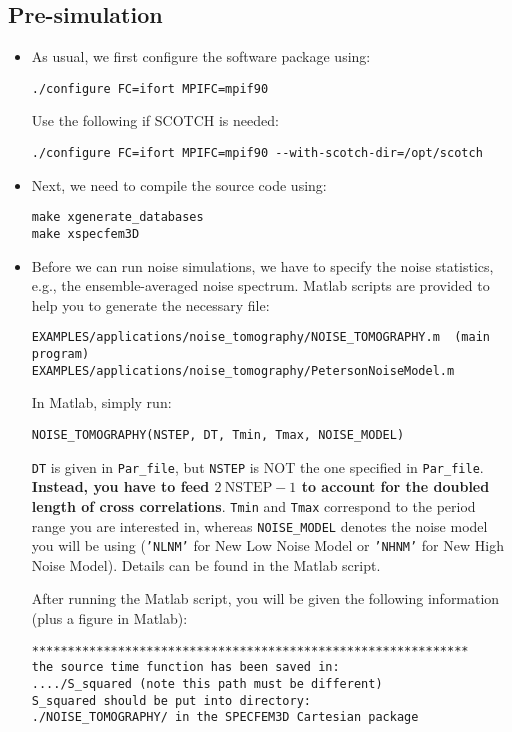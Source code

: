 \subsection{Pre-simulation}
\begin{itemize}
\item As usual, we first configure the software package using:
\begin{verbatim}
./configure FC=ifort MPIFC=mpif90
\end{verbatim}

Use the following if SCOTCH is needed:
\begin{verbatim}
./configure FC=ifort MPIFC=mpif90 --with-scotch-dir=/opt/scotch
\end{verbatim}

\item Next, we need to compile the source code using:
\begin{verbatim}
make xgenerate_databases
make xspecfem3D
\end{verbatim}

\item Before we can run noise simulations, we have to specify the noise
statistics, e.g., the ensemble-averaged noise spectrum. Matlab scripts
are provided to help you to generate the necessary file:
\begin{verbatim}
EXAMPLES/applications/noise_tomography/NOISE_TOMOGRAPHY.m  (main program)
EXAMPLES/applications/noise_tomography/PetersonNoiseModel.m
\end{verbatim}

In Matlab, simply run:
\begin{verbatim}
NOISE_TOMOGRAPHY(NSTEP, DT, Tmin, Tmax, NOISE_MODEL)
\end{verbatim}

\texttt{DT} is given in \texttt{Par\_file}, but {\color{red} \texttt{NSTEP} is
NOT the one specified in \texttt{Par\_file}}. {\bf Instead, you have to
feed $2~\mathrm{NSTEP}-1$ to account for the doubled length of cross
correlations}. \texttt{Tmin} and \texttt{Tmax} correspond to the period
range you are interested in, whereas \texttt{NOISE\_MODEL} denotes
the noise model you will be using
(\texttt{'NLNM'} for New Low Noise Model or \texttt{'NHNM'} for New High Noise Model).
Details can be found in the Matlab script.


After running the Matlab script, you will be given the following information
(plus a figure in Matlab):
\begin{verbatim}
*************************************************************
the source time function has been saved in:
..../S_squared (note this path must be different)
S_squared should be put into directory:
./NOISE_TOMOGRAPHY/ in the SPECFEM3D Cartesian package
\end{verbatim}


\end{itemize}
